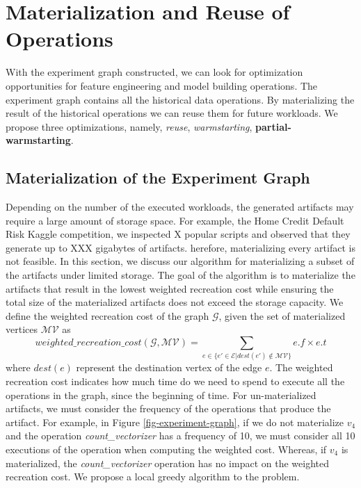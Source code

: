 \section{Materialization and Reuse of Operations}\label{sec-materializaiton-and-reuse}
With the experiment graph constructed, we can look for optimization opportunities for feature engineering and model building operations.
The experiment graph contains all the historical data operations.
By materializing the result of the historical operations we can reuse them for future workloads.
We propose three optimizations, namely, \textit{reuse}, \textit{warmstarting}, \textbf{partial-warmstarting}.

\subsection{Materialization of the Experiment Graph}
Depending on the number of the executed workloads, the generated artifacts may require a large amount of storage space.
For example, the Home Credit Default Risk Kaggle competition, we inspected X popular scripts and observed that they generate up to XXX gigabytes of artifacts. 
herefore, materializing every artifact is not feasible.
In this section, we discuss our algorithm for materializing a subset of the artifacts under limited storage.
The goal of the algorithm is to materialize the artifacts that result in the lowest weighted recreation cost while ensuring the total size of the materialized artifacts does not exceed the storage capacity.
We define the weighted recreation cost of the graph $\mathcal{G}$, given the set of materialized vertices $\mathcal{MV}$ as 
\[
weighted\_recreation\_cost(\mathcal{G}, \mathcal{MV}) =  \sum\limits_{e \in \{e' \in \mathcal{E}  \lvert dest(e') \notin \mathcal{MV}\}}  e.f \times e.t
\]
where $dest(e)$ represent the destination vertex of the edge $e$.
The weighted recreation cost indicates how much time do we need to spend to execute all the operations in the graph, since the beginning of time.
For un-materialized artifacts, we must consider the frequency of the operations that produce the artifact.
For example, in Figure \ref{fig-experiment-graph}, if we do not materialize $v_4$ and the operation \textit{count\_vectorizer} has a frequency of 10, we must consider all 10 executions of the operation when computing the weighted cost.
Whereas, if $v_4$ is materialized, the \textit{count\_vectorizer} operation has no impact on the weighted recreation cost.
We propose a local greedy algorithm to the problem.

